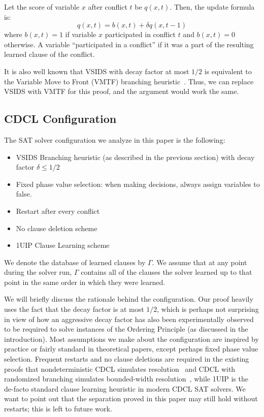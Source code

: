 \documentclass[10pt,a4paper]{article}
\begin{document}
Let the score of variable $x$ after conflict $t$ be $q(x, t)$. Then, the update formula is:
$$q(x, t) = b(x, t) + \delta q(x, t - 1)$$
where $b(x, t) = 1$ if variable $x$ participated in conflict $t$ and $b(x, t) = 0$ otherwise. A variable ``participated in a conflict'' if it was a part of the resulting learned clause of the conflict.

It is also well known that VSIDS with decay factor at most $1/2$ is equivalent to the Variable Move to Front (VMTF) branching heuristic~\cite{Rya04Efficient,DBLP:conf/sat/BiereF15}. Thus, we can replace VSIDS with VMTF for this proof, and the argument would work the same. 


\subsection{CDCL Configuration}
\label{sec:configuration}

The SAT solver configuration we analyze in this paper is the following:
\begin{itemize}
    \item VSIDS Branching heuristic (as described in the previous section) with decay factor $\delta \leq 1/2$
    \item Fixed phase value selection: when making decisions, always assign variables to false.
    \item Restart after every conflict
    \item No clause deletion scheme
    \item 1UIP Clause Learning scheme
\end{itemize}

We denote the database of learned clauses by $\Gamma$. We assume that at any point during the solver run, $\Gamma$ contains all of the clauses the solver learned up to that point in the same order in which they were learned. 

We will briefly discuss the rationale behind the configuration. Our proof heavily uses the fact that the decay factor is at most $1/2$, which is perhaps not surprising in view of how an aggressive decay factor has also been experimentally observed to be required to solve instances of the Ordering Principle (as discussed in the introduction). Most assumptions we make about the configuration are inspired by practice or fairly standard in theoretical papers, except perhaps fixed phase value selection. Frequent restarts and no clause deletions are required in the existing proofs that nondeterministic CDCL simulates resolution~\cite{simres} and CDCL with randomized branching simulates bounded-width resolution~\cite{manyrestarts}, while 1UIP is the de-facto standard clause learning heuristic in modern CDCL SAT solvers. We want to point out that the separation proved in this paper may still hold without restarts; this is left to future work.
\end{document}
